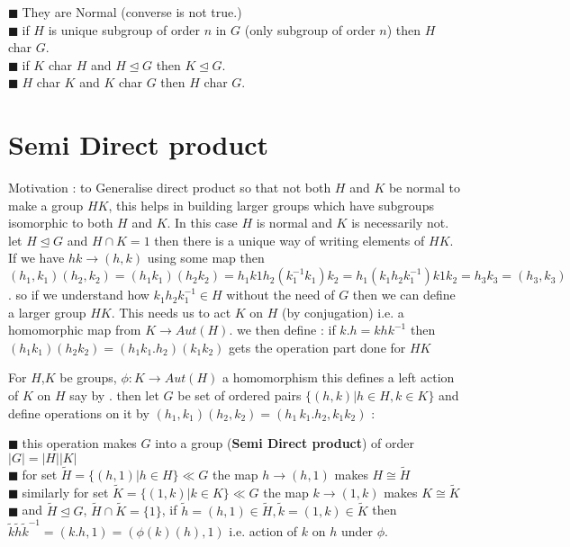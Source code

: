 \documentclass[11pt]{extarticle}
\newcommand{\ra}{\rightarrow}
\newcommand{\y}{$\blacksquare\;$}
\newcommand{\tbx}[2][]{
	\begin{tcolorbox}[enhanced,breakable,size=small,colback=black!2!white,title={#1},arc is angular, arc=1.5mm,drop fuzzy shadow]
		#2
	\end{tcolorbox}
}
\begin{document}
\begin{multicols}{2}
{			\y  They are Normal (converse is not true.) \\
			\y  if $ H $ is unique subgroup of order $ n $ in $ G $ (only subgroup of order $ n $) then $ H $ char $ G. $ \\
			\y  if $ K $ char $H$ and $ H\trianglelefteq G $ then $ K\trianglelefteq G .$ \\
			\y  $ H $ char $ K $  and $ K $ char $ G $ then $ H $ char $ G .$  
	}
		\section{Semi Direct product}
	
	\tbx{Motivation :  to Generalise direct product so that not both $ H $ and $ K $ be normal to make a group 
		$ HK $, this helps in building larger groups which have subgroups isomorphic to both $ H $ and $ K $. In this case $ H $ is normal and $ K $ is necessarily not.
		let $ H \trianglelefteq G $ and $ H\cap K=1 $ then there is a unique way of writing elements of $ HK $.
		If we have $ hk \ra (h,k) $ using some map then $ (h_1,k_1)(h_2,k_2)=(h_1k_1)(h_2k_2)=h_1k1h_2 (k_1^{-1}k_1) k_2=h_1(k_1h_2k_1^{-1}) k1k_2= h_3 k_3=(h_3,k_3)$. so if we understand how  $k_1h_2k_1^{-1}  \in H$ without the need of $ G $ then we can define a larger group $ HK $. This needs us to act $ K $ on $ H $ (by conjugation)  
		i.e. a homomorphic map from $ K \ra Aut(H). $ we then define :  if $ k.h= k h k^{-1} $ then $ (h_1k_1)(h_2k_2) 
		= (h_1k_1.h_2)(k_1k_2)$ gets the operation part done for $ HK $
	}
	\tbx{For $  H$,$ K $ be groups, $ \phi :K \ra Aut(H) $ a homomorphism this defines a left action of $ K $ on $ H $ say by $ . $ then let $ G $ be set of ordered pairs $ \{(h,k)|h\in H, k\in K\} $ and define operations on it by 
		$ (h_1,k_1)(h_2,k_2)=(h_1\, k_1.h_2, k_1k_2) $ :
		
		\y  this operation makes $ G $ into a group (\textbf{Semi Direct product}) of order $ |G|=|H||K| $ \\
		\y  for set $ \tilde{H}=\{(h,1)|h\in H\} \ll G$ the map $ h \ra (h,1) $ makes $ H\cong \tilde{H} $  \\
		\y  similarly for set $ \tilde{K}=\{(1,k)|k\in K\} \ll G$ the map $ k \ra (1,k) $ makes $ K\cong \tilde{K} $  \\
		\y  and  $ \tilde{H}\trianglelefteq G$, $ \tilde{H}\cap \tilde{K}= \{1\} $, if $\tilde{h}= (h,1)\in \tilde{H}, \tilde{k}=(1,k)\in \tilde{K} $ then \\
		$ \tilde{k }\tilde{h} \tilde{k}^{-1}=(k.h,1) = (\phi(k)(h),1)$ i.e. action of $ k $ on $ h $ under $ \phi .$
		
}
\end{multicols}
\end{document}
